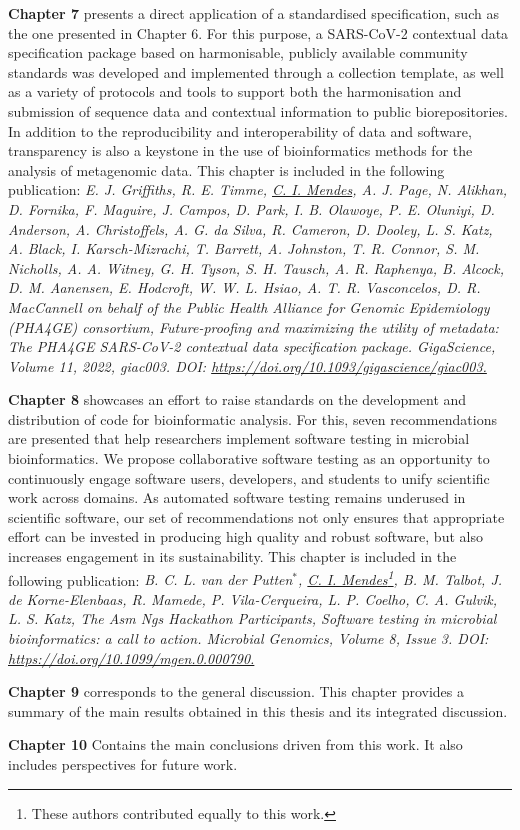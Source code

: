 \textbf{Chapter 7} presents a direct application of a standardised specification, such as the one presented in Chapter 6. For this purpose, a SARS-CoV-2 contextual data specification package based on harmonisable, publicly available community standards was developed and implemented through a collection template, as well as a variety of protocols and tools to support both the harmonisation and submission of sequence data and contextual information to public biorepositories. In addition to the reproducibility and interoperability of data and software, transparency is also a keystone in the use of bioinformatics methods for the analysis of metagenomic data. This chapter is included in the following publication: \textit{E. J. Griffiths, R. E. Timme, \underline{C. I. Mendes}, A. J. Page, N. Alikhan, D. Fornika, F. Maguire, J. Campos, D. Park, I. B. Olawoye, P. E. Oluniyi, D. Anderson, A. Christoffels, A. G. da Silva, R. Cameron, D. Dooley, L. S. Katz, A. Black, I. Karsch-Mizrachi, T. Barrett, A. Johnston, T. R. Connor, S. M. Nicholls, A. A. Witney, G. H. Tyson, S. H. Tausch, A. R. Raphenya, B. Alcock, D. M. Aanensen, E. Hodcroft, W. W. L. Hsiao, A. T. R. Vasconcelos, D. R. MacCannell on behalf of the Public Health Alliance for Genomic Epidemiology (PHA4GE) consortium, Future-proofing and maximizing the utility of metadata: The PHA4GE SARS-CoV-2 contextual data specification package. GigaScience, Volume 11, 2022, giac003. DOI: \url{https://doi.org/10.1093/gigascience/giac003.}} 

\textbf{Chapter 8} showcases an effort to raise standards on the development and distribution of code for bioinformatic analysis. For this, seven recommendations are presented that help researchers implement software testing in microbial bioinformatics. We propose collaborative software testing as an opportunity to continuously engage software users, developers, and students to unify scientific work across domains. As automated software testing remains underused in scientific software, our set of recommendations not only ensures that appropriate effort can be invested in producing high quality and robust software, but also increases engagement in its sustainability. This chapter is included in the following publication: \textit{B. C. L. van der Putten$^*$, \underline{C. I. Mendes}\footnote[1]{These authors contributed equally to this work.}, B. M. Talbot, J. de Korne-Elenbaas, R. Mamede, P. Vila-Cerqueira, L. P. Coelho, C. A. Gulvik, L. S. Katz, The Asm Ngs Hackathon Participants, Software testing in microbial bioinformatics: a call to action. Microbial Genomics, Volume 8, Issue 3. DOI: \url{https://doi.org/10.1099/mgen.0.000790.}}

\textbf{Chapter 9} corresponds to the general discussion. This chapter provides a summary of the main results obtained in this thesis and its integrated discussion. 

\textbf{Chapter 10} Contains the main conclusions driven from this work. It also includes perspectives for future work. 